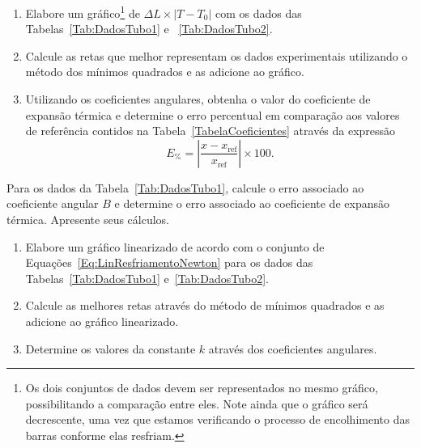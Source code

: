 \begin{question}[type={exam}]{1.5}
\begin{enumerate}[label=\roman*.]
\item Elabore um gráfico\footnote{Os dois conjuntos de dados devem ser representados no mesmo gráfico, possibilitando a comparação entre eles. Note ainda que o gráfico será decrescente, uma vez que estamos verificando o processo de encolhimento das barras conforme elas resfriam.} de $\Delta L \times |T - T_0|$ com os dados das Tabelas~\ref{Tab:DadosTubo1} e~ \ref{Tab:DadosTubo2}.

\item Calcule as retas que melhor representam os dados experimentais utilizando o método dos mínimos quadrados e as adicione ao gráfico.
\item Utilizando os coeficientes angulares, obtenha o valor do coeficiente de expansão térmica e determine o erro percentual em comparação aos valores de referência contidos na Tabela~\ref{TabelaCoeficientes} através da expressão
\begin{equation}
	E_{\%} = \left|\frac{x-x_{\textrm{ref}}}{x_{\textrm{ref}}}\right| \times 100.
\end{equation}
\end{enumerate}
\end{question}

\begin{question}[type={exam}]{2}
Para os dados da Tabela~\ref{Tab:DadosTubo1}, calcule o erro associado ao coeficiente angular $B$ e determine o erro associado ao coeficiente de expansão térmica. Apresente seus cálculos.
\end{question}


\begin{question}[type={exam}]{1.5}
\begin{enumerate}[label=\roman*.]
\item Elabore um gráfico linearizado de acordo com o conjunto de Equações~\eqref{Eq:LinResfriamentoNewton} para os dados das  Tabelas~\ref{Tab:DadosTubo1} e~\ref{Tab:DadosTubo2}.
\item Calcule as melhores retas através do método de mínimos quadrados e as adicione ao gráfico linearizado.
\item Determine os valores da constante $k$ através dos coeficientes angulares.
\end{enumerate}
\end{question}

